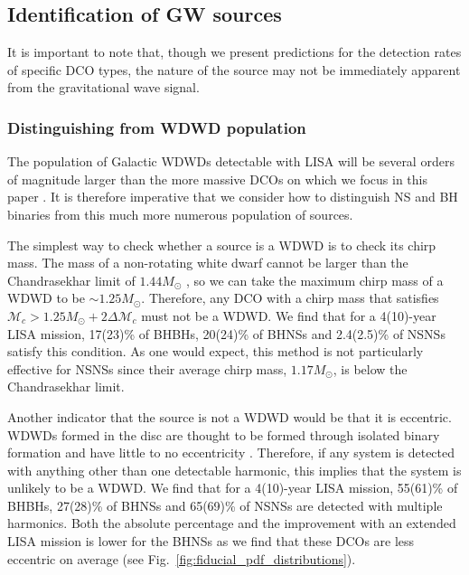 \subsection{Identification of GW sources}
It is important to note that, though we present predictions for the detection rates of specific DCO types, the nature of the source may not be immediately apparent from the gravitational wave signal.

\subsubsection{Distinguishing from WDWD population}\label{sec:WDWD_distinguish}
The population of Galactic WDWDs detectable with LISA will be several orders of magnitude larger than the more massive DCOs on which we focus in this paper \citep[e.g.][]{Korol+2017}. It is therefore imperative that we consider how to distinguish NS and BH binaries from this much more numerous population of sources.

The simplest way to check whether a source is a WDWD is to check its chirp mass. The mass of a non-rotating white dwarf cannot be larger than the Chandrasekhar limit of $1.44 \unit{M_\odot}$ \citep{Chandrasekhar+1931}, so we can take the maximum chirp mass of a WDWD to be $\sim 1.25 \unit{M_{\odot}}$. Therefore, any DCO with a chirp mass that satisfies $\mathcal{M}_c > 1.25 \unit{M_{\odot}} + 2 \Delta \mathcal{M}_c$ must not be a WDWD. We find that for a 4(10)-year LISA mission, 17(23)\% of BHBHs, 20(24)\% of BHNSs and 2.4(2.5)\% of NSNSs satisfy this condition. As one would expect, this method is not particularly effective for NSNSs since their average chirp mass, $1.17 \unit{M_\odot}$, is below the Chandrasekhar limit.

Another indicator that the source is not a WDWD would be that it is eccentric. WDWDs formed in the disc are thought to be formed through isolated binary formation and have little to no eccentricity \citep[e.g.][]{Nelemans+2001}. Therefore, if any system is detected with anything other than one detectable harmonic, this implies that the system is unlikely to be a WDWD. We find that for a 4(10)-year LISA mission, 55(61)\% of BHBHs, 27(28)\% of BHNSs and 65(69)\% of NSNSs are detected with multiple harmonics. Both the absolute percentage and the improvement with an extended LISA mission is lower for the BHNSs as we find that these DCOs are less eccentric on average (see Fig.~\ref{fig:fiducial_pdf_distributions}).

